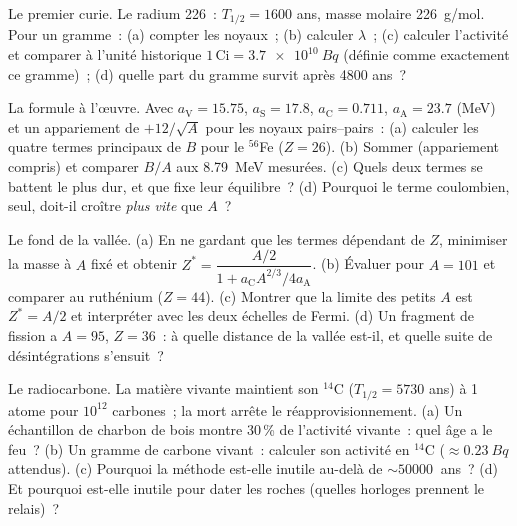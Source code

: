 \begin{exercise}[$\star$]\label{exo:b3:nuclear-physics:4}
Le premier curie. Le radium 226~: $T_{1/2} = 1600$ ans, masse molaire
\qty{226}{g/mol}. Pour un gramme~: (a) compter les noyaux~; (b)
calculer $\lambda$~; (c) calculer l'activité et comparer à l'unité
historique $1\,\text{Ci} = \qty{3.7e10}{Bq}$ (définie comme
exactement ce gramme)~; (d) quelle part du gramme survit après
4800 ans~?
\end{exercise}

\begin{exercise}[$\star\star$]\label{exo:b3:nuclear-physics:5}
La formule à l'œuvre. Avec $a_{\text{V}} = 15.75$,
$a_{\text{S}} = 17.8$, $a_{\text{C}} = 0.711$,
$a_{\text{A}} = 23.7$ (\unit{MeV}) et un appariement de
$+12/\sqrt A$ pour les noyaux pairs--pairs~: (a) calculer les quatre
termes principaux de $B$ pour le $^{56}$Fe ($Z = 26$). (b) Sommer
(appariement compris) et comparer $B/A$ aux \qty{8.79}{MeV}
mesurées. (c) Quels deux termes se battent le plus dur, et que fixe
leur équilibre~? (d) Pourquoi le terme coulombien, seul, doit-il
croître \emph{plus vite} que $A$~?
\end{exercise}

\begin{exercise}[$\star\star$]\label{exo:b3:nuclear-physics:6}
Le fond de la vallée. (a) En ne gardant que les termes dépendant de
$Z$, minimiser la masse à $A$ fixé et obtenir
$Z^* = \dfrac{A/2}{1 + a_{\text{C}}A^{2/3}/4a_{\text{A}}}$. (b)
Évaluer pour $A = 101$ et comparer au ruthénium ($Z = 44$).
(c) Montrer que la limite des petits $A$ est $Z^* = A/2$ et
interpréter avec les deux échelles de Fermi. (d) Un fragment de
fission a $A = 95$, $Z = 36$~: à quelle distance de la vallée est-il,
et quelle suite de désintégrations s'ensuit~?
\end{exercise}

\begin{exercise}[$\star\star$]\label{exo:b3:nuclear-physics:7}
Le radiocarbone. La matière vivante maintient son $^{14}$C
($T_{1/2} = 5730$ ans) à 1 atome pour $10^{12}$ carbones~; la mort
arrête le réapprovisionnement. (a) Un échantillon de charbon de bois
montre 30\,\% de l'activité vivante~: quel âge a le feu~? (b) Un
gramme de carbone vivant~: calculer son activité en $^{14}$C
($\approx\qty{0.23}{Bq}$ attendus). (c) Pourquoi la méthode est-elle
inutile au-delà de $\sim\qty{50000}{}$ ans~? (d) Et pourquoi
est-elle inutile pour dater les roches (quelles horloges prennent le
relais)~?
\end{exercise}


